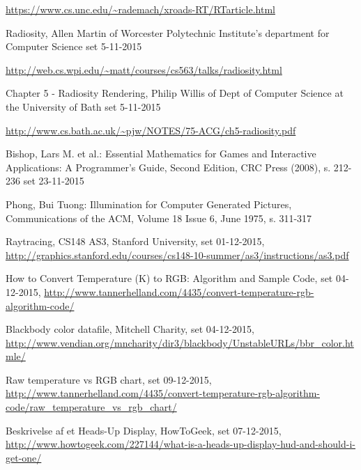 \begin{thebibliography}{99}
  \url{https://www.cs.unc.edu/~rademach/xroads-RT/RTarticle.html}

  Radiosity,
  Allen Martin of Worcester Polytechnic Institute's department for Computer Science
  set 5-11-2015

  \url{http://web.cs.wpi.edu/~matt/courses/cs563/talks/radiosity.html}

  Chapter 5 - Radiosity Rendering,
  Philip Willis of Dept of Computer Science at the University of Bath
  set 5-11-2015

  \url{http://www.cs.bath.ac.uk/~pjw/NOTES/75-ACG/ch5-radiosity.pdf}
  
  Bishop, Lars M. et al.: Essential Mathematics for Games and Interactive Applications:
  A Programmer’s Guide, Second Edition, CRC Press (2008), s. 212-236
  set 23-11-2015
  
  Phong, Bui Tuong: Illumination for Computer Generated Pictures,  Communications of the ACM, Volume 18 Issue 6, June 1975, s. 311-317

  Raytracing, CS148 AS3, Stanford University, set 01-12-2015,
  \url{http://graphics.stanford.edu/courses/cs148-10-summer/as3/instructions/as3.pdf}

  How to Convert Temperature (K) to RGB: Algorithm and Sample Code, set 04-12-2015,
  \url{http://www.tannerhelland.com/4435/convert-temperature-rgb-algorithm-code/}
  
  Blackbody color datafile, Mitchell Charity, set 04-12-2015,
  \url{http://www.vendian.org/mncharity/dir3/blackbody/UnstableURLs/bbr_color.htmle/}
  
  Raw temperature vs RGB chart, set 09-12-2015,
  \url{http://www.tannerhelland.com/4435/convert-temperature-rgb-algorithm-code/raw_temperature_vs_rgb_chart/}
  
  Beskrivelse af et Heads-Up Display, HowToGeek, set 07-12-2015,
  \url{http://www.howtogeek.com/227144/what-is-a-heads-up-display-hud-and-should-i-get-one/}



% 


\end{thebibliography}
